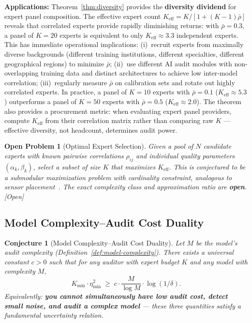 \documentclass[12pt,a4paper]{article}
\newtheorem{openproblem}[theorem]{Open Problem}
\newtheorem{conjecture}[theorem]{Conjecture}
\newcommand{\openquest}{\textcolor{red!70!black}{\small\textsf{[Open]}}}
\newcommand{\etamin}{\eta_{\min}}
\newcommand{\rhobar}{\bar{\rho}}
\begin{document}
\medskip\noindent
\textbf{Applications:}
Theorem~\ref{thm:diversity} provides the \textbf{diversity dividend} for
expert panel composition.  The effective expert count
$K_{\mathrm{eff}}=K/[1+(K-1)\rhobar]$ reveals that correlated experts
provide rapidly diminishing returns: with $\rhobar=0.3$, a panel of
$K=20$ experts is equivalent to only $K_{\mathrm{eff}}\approx 3.3$ independent
experts.  This has immediate operational implications: (i)~recruit experts
from maximally diverse backgrounds (different training institutions, different
specialties, different geographical regions) to minimize $\rhobar$;
(ii)~use different AI audit modules with non-overlapping training data and
distinct architectures to achieve low inter-model correlation;
(iii)~regularly measure $\rhobar$ on calibration sets and rotate out
highly correlated experts.  In practice, a panel of $K=10$ experts with
$\rhobar=0.1$ ($K_{\mathrm{eff}}\approx 5.3$) outperforms a panel of
$K=50$ experts with $\rhobar=0.5$ ($K_{\mathrm{eff}}\approx 2.0$).  The
theorem also provides a procurement metric: when evaluating expert panel
providers, compute $K_{\mathrm{eff}}$ from their correlation matrix rather
than comparing raw $K$ --- effective diversity, not headcount, determines
audit power.

\begin{openproblem}[Optimal Expert Selection]
\label{prob:expert-selection}
Given a pool of $N$ candidate experts with known pairwise correlations
$\rho_{ij}$ and individual quality parameters $(\alpha_k,\beta_k)$, select a
subset of size $K$ that maximizes $K_{\mathrm{eff}}$.  This is conjectured
to be a submodular maximization problem with cardinality constraint, analogous
to sensor placement~\citep{krause2008near}.  The exact complexity class and
approximation ratio are \textbf{open}.  \openquest
\end{openproblem}

\subsection{Model Complexity--Audit Cost Duality}

\begin{conjecture}[Model Complexity--Audit Cost Duality]
\label{conj:duality}
Let $M$ be the model's audit complexity (Definition~\ref{def:model-complexity}).
There exists a universal constant $c>0$ such that for any auditor with expert
budget $K$ and any model with complexity $M$,
\begin{equation}\label{eq:duality}
    K_{\min} \cdot \etamin^{2} \;\geq\;
    c \cdot \frac{M}{\log M} \cdot \log(1/\delta).
\end{equation}
Equivalently: \textbf{you cannot simultaneously have low audit cost, detect
small noise, and audit a complex model} --- these three quantities satisfy a
fundamental uncertainty relation.
\end{conjecture}
\end{document}
